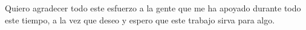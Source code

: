 
\begin{agradecimientos}
Quiero agradecer todo este esfuerzo a la gente que me ha apoyado durante todo
este tiempo, a la vez que deseo y espero que este trabajo sirva para algo.
\end{agradecimientos}